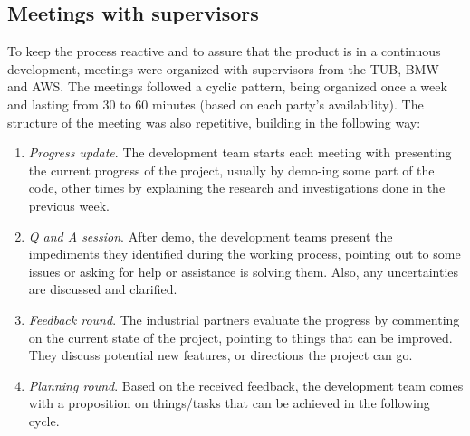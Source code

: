         \subsection{Meetings with supervisors}
        To keep the process reactive and to assure that the product is in a continuous development, meetings were organized with supervisors from the TUB, BMW and AWS. The meetings followed a cyclic pattern, being organized once a week and lasting from 30 to 60 minutes (based on each party’s availability). The structure of the meeting was also repetitive, building in the following way:
        \begin{enumerate}
            \item \textit{Progress update}. The development team starts each meeting with presenting the current progress of the project, usually by demo-ing some part of the code, other times by explaining the research and investigations done in the previous week.
            \item \textit{Q and A session}. After demo, the development teams present the impediments they identified during the working process, pointing out to some issues or asking for help or assistance is solving them. Also, any uncertainties are discussed and clarified.
            \item \textit{Feedback round}. The industrial partners evaluate the progress by commenting on the current state of the project, pointing to things that can be improved. They discuss potential new features, or directions the project can go.
            \item \textit{Planning round}. Based on the received feedback, the development team comes with a proposition on things/tasks that can be achieved in the following cycle.
        \end{enumerate}